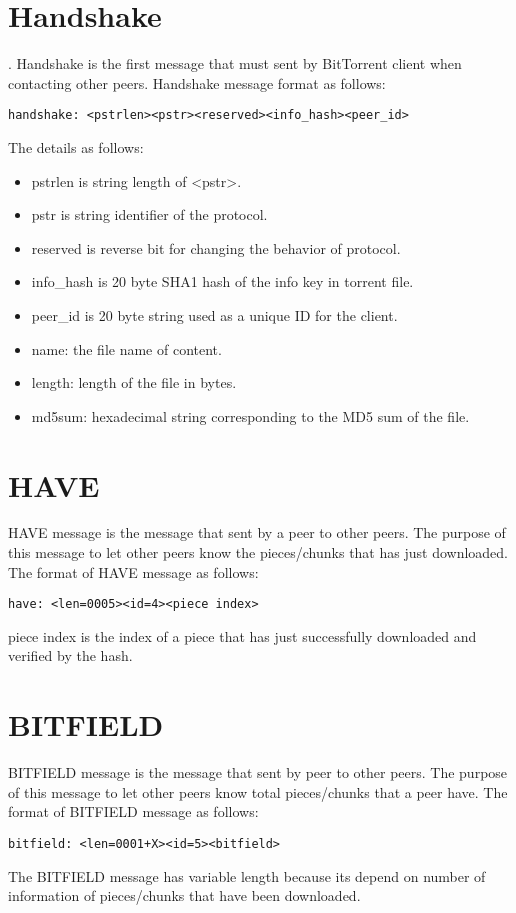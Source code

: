 \begin{appendices}
\section{Handshake}.  
Handshake is the first message that must sent by BitTorrent client when contacting other peers. 
Handshake message format as follows: 
\begin{verbatim}
handshake: <pstrlen><pstr><reserved><info_hash><peer_id>
\end{verbatim}
The details as follows:
\begin{itemize}
	\item pstrlen is string length of <pstr>.
	\item pstr is string identifier of the protocol.
	\item reserved is reverse bit for changing the behavior of protocol.
	\item info\_hash is 20 byte SHA1 hash of the info key in torrent file. 
	\item peer\_id is 20 byte string used as a unique ID for the client.
	\item name:  the file name of content.
	\item length: length of the file in bytes.
	\item md5sum: hexadecimal string corresponding to the MD5 sum of the file. 
\end{itemize}

\section{HAVE}
HAVE message is the message that sent by a peer to other peers.  
The purpose of this message to let other peers know the pieces/chunks that has just downloaded.
The format of HAVE message as follows:
\begin{verbatim}
have: <len=0005><id=4><piece index>
\end{verbatim}
piece index is the index of a piece that has just successfully downloaded and verified by the hash.

\section{BITFIELD}

BITFIELD message is the message that sent by peer to other peers.
The purpose of this message to let other peers know total pieces/chunks that a peer have.
The format of BITFIELD message as follows:
\begin{verbatim}
bitfield: <len=0001+X><id=5><bitfield>
\end{verbatim}
The BITFIELD message has variable length because its depend on number of information of pieces/chunks that have been downloaded. 



\end{appendices}
